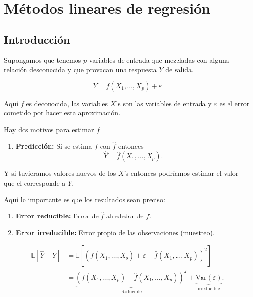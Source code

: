 \documentclass[
  12pt,
]{book}
\providecommand{\tightlist}{%
  \setlength{\itemsep}{0pt}\setlength{\parskip}{0pt}}
\theoremstyle{definition}
\theoremstyle{definition}
\theoremstyle{definition}
\theoremstyle{remark}
\begin{document}
\hypertarget{muxe9todos-lineares-de-regresiuxf3n}{%
\chapter{Métodos lineares de regresión}\label{muxe9todos-lineares-de-regresiuxf3n}}

\hypertarget{introducciuxf3n-1}{%
\section{Introducción}\label{introducciuxf3n-1}}

Supongamos que tenemos \(p\) variables de entrada que mezcladas con alguna relación desconocida y que provocan una respuesta \(Y\) de salida.

\begin{equation}
Y = f(X_{1},\ldots,X_{p}) + \varepsilon
\label{eq:regresion-general}
\end{equation}

Aquí \(f\) es deconocida, las variables \(X\)'s son las variables de entrada y \(\varepsilon\) es el error cometido por hacer esta aproximación.

Hay dos motivos para estimar \(f\)

\begin{enumerate}
\def\labelenumi{\arabic{enumi}.}
\tightlist
\item
  \textbf{Predicción:} Si se estima \(f\) con \(\hat{f}\) entonces
  \begin{equation*}
  \hat{Y} = \hat{f}(X_{1},\ldots,X_{p}). 
  \end{equation*}
\end{enumerate}

Y si tuvieramos valores nuevos de los \(X\)'s entonces podríamos estimar el valor que el corresponde a \(Y\).

Aquí lo importante es que los resultados sean preciso:

\begin{enumerate}
\def\labelenumi{\alph{enumi}.}
\tightlist
\item
  \textbf{Error reducible:} Error de \(\hat{f}\) alrededor de \(f\).
\item
  \textbf{Error irreducible:} Error propio de las observaciones (muestreo).
\end{enumerate}

\begin{align*}
\mathbb{E}\left[\hat{Y}-Y\right] 
&=  \mathbb{E}\left[\left(  f(X_{1},\ldots,X_{p}) + \varepsilon - \hat{f}(X_{1},\ldots,X_{p}) \right)^{2}  \right] \\
&= \underbrace{\left( f(X_{1},\ldots,X_{p})- \hat{f}(X_{1},\ldots,X_{p})  \right) ^{2} }_{\text{Reducible}}
+\underbrace{\mathrm{Var}\left(\varepsilon\right)}_{\text{irreducible}}. 
\end{align*}
\end{document}
